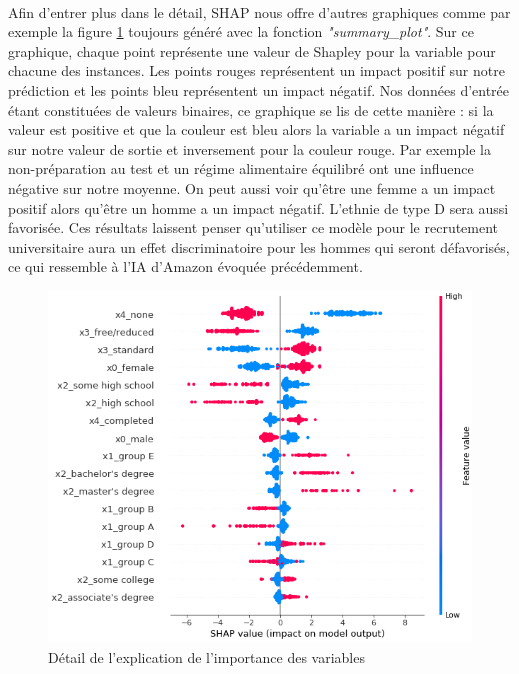 \paragraph{}Afin d'entrer plus dans le détail, SHAP nous offre d'autres graphiques comme par exemple la figure \ref{shapPlotDetail} toujours généré avec la fonction \textit{"summary\_plot"}. Sur ce graphique, chaque point représente une valeur de Shapley pour la variable pour chacune des instances. Les points rouges représentent un impact positif sur notre prédiction et les points bleu représentent un impact négatif. Nos données d'entrée étant constituées de valeurs binaires, ce graphique se lis de cette manière : si la valeur est positive et que la couleur est bleu alors la variable a un impact négatif sur notre valeur de sortie et inversement pour la couleur rouge. Par exemple la non-préparation au test et un régime alimentaire équilibré ont une influence négative sur notre moyenne. On peut aussi voir qu'être une femme a un impact positif alors qu'être un homme a un impact négatif. L’ethnie de type D sera aussi favorisée. Ces résultats laissent penser qu'utiliser ce modèle pour le recrutement universitaire aura un effet discriminatoire pour les hommes qui seront défavorisés, ce qui ressemble à l’IA d’Amazon évoquée précédemment.
\begin{figure}[h]
    \includegraphics[scale=0.6]{src_img/shapPlotDetail.png}
    \caption{Détail de l'explication de l'importance des variables}
    \label{shapPlotDetail}
\end{figure}
